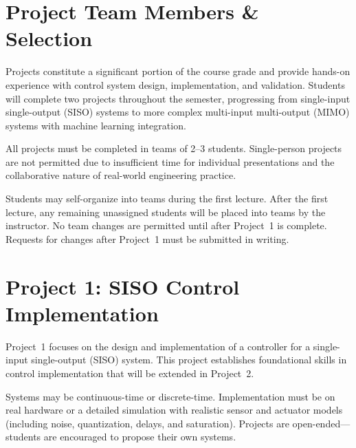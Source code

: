 \documentclass[11pt,letterpaper]{article}
\begin{document}

\section*{Project Team Members \& Selection}
\label{sec:team-formation}

Projects constitute a significant portion of the course grade and provide hands-on experience with control system design, implementation, and validation. Students will complete two projects throughout the semester, progressing from single-input single-output (SISO) systems to more complex multi-input multi-output (MIMO) systems with machine learning integration.

All projects must be completed in teams of 2--3 students. Single-person projects are not permitted due to insufficient time for individual presentations and the collaborative nature of real-world engineering practice.

Students may self-organize into teams during the first lecture. After the first lecture, any remaining unassigned students will be placed into teams by the instructor. No team changes are permitted until after Project~1 is complete. Requests for changes after Project~1 must be submitted in writing.


\section*{Project 1: SISO Control Implementation}
\label{sec:project1}

Project~1 focuses on the design and implementation of a controller for a single-input single-output (SISO) system. This project establishes foundational skills in control implementation that will be extended in Project~2.

Systems may be continuous-time or discrete-time. Implementation must be on real hardware or a detailed simulation with realistic sensor and actuator models (including noise, quantization, delays, and saturation). Projects are open-ended---students are encouraged to propose their own systems.
\end{document}
